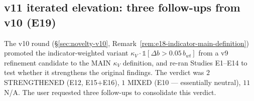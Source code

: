 \documentclass[11pt,a4paper]{article}
\theoremstyle{plain}
\theoremstyle{definition}
\theoremstyle{remark}
\begin{document}
\subsection{v11 iterated elevation: three follow-ups from v10
(E19)}\label{sec:novelty-v11}

The v10 round (\S\ref{sec:novelty-v10}, Remark~\ref{rem:e18-indicator-main-definition})
promoted the indicator-weighted variant
$\kappa_V \cdot \mathbb{1}[\Delta b > 0.05\,b_{wt}]$ from a v9 refinement
candidate to the MAIN $\kappa_V$ definition, and re-ran Studies
E1--E14 to test whether it strengthens the original findings. The
verdict was $2$ STRENGTHENED (E12, E15$+$E16), $1$ MIXED (E10 —
essentially neutral), $11$ N/A. The user requested three follow-ups
to consolidate this verdict.
\end{document}

